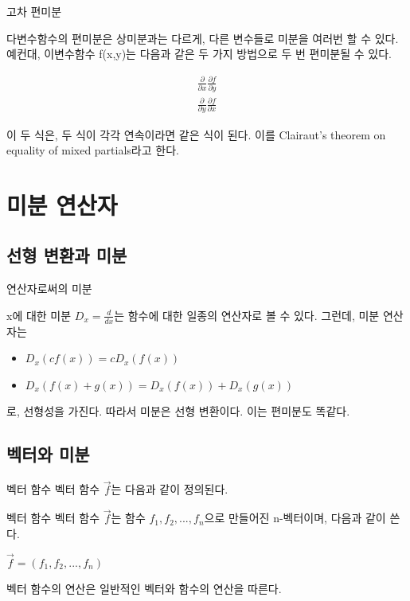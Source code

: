 \documentclass{beamer}
\begin{document}
\begin{frame}{고차 편미분} 

다변수함수의 편미분은 상미분과는 다르게, 다른 변수들로 미분을 여러번 할 수 있다. 예컨대, 이변수함수 f(x,y)는 다음과 같은 두 가지 방법으로 두 번 편미분될 수 있다. 

\begin{eqnarray} 
\frac{\partial }{\partial x} \frac{\partial f}{\partial y} \\
\frac{\partial }{\partial y}\frac{\partial f}{\partial x}
\end{eqnarray}

이 두 식은, 두 식이 각각 연속이라면 같은 식이 된다. 이를 Clairaut's theorem on equality of mixed partials라고 한다. 


\end{frame}








\section{미분 연산자}

\subsection{선형 변환과 미분} 

\begin{frame}{연산자로써의 미분}

x에 대한 미분 $D_x = \frac{d}{dx}$는 함수에 대한 일종의 연산자로 볼 수 있다. 그런데, 미분 연산자는 
\begin{itemize} 
\item $D_x(cf(x)) = cD_x(f(x))$
\item $D_x(f(x) + g(x)) = D_x(f(x)) + D_x(g(x))$ 
\end{itemize}
로, 선형성을 가진다. 따라서 미분은 선형 변환이다. 이는 편미분도 똑같다. 
\end{frame} 

\subsection{벡터와 미분} 

\begin{frame}{벡터 함수}
벡터 함수 $\vec{f}$는 다음과 같이 정의된다. 

\begin{block}{벡터 함수} 
벡터 함수 $\vec{f}$는 함수 $f_1, f_2, ... , f_n$으로 만들어진 n-벡터이며, 다음과 같이 쓴다. 

$\vec{f} = (f_1, f_2, ..., f_n) $
\end{block}

벡터 함수의 연산은 일반적인 벡터와 함수의 연산을 따른다. 
\end{frame} 
\end{document}
